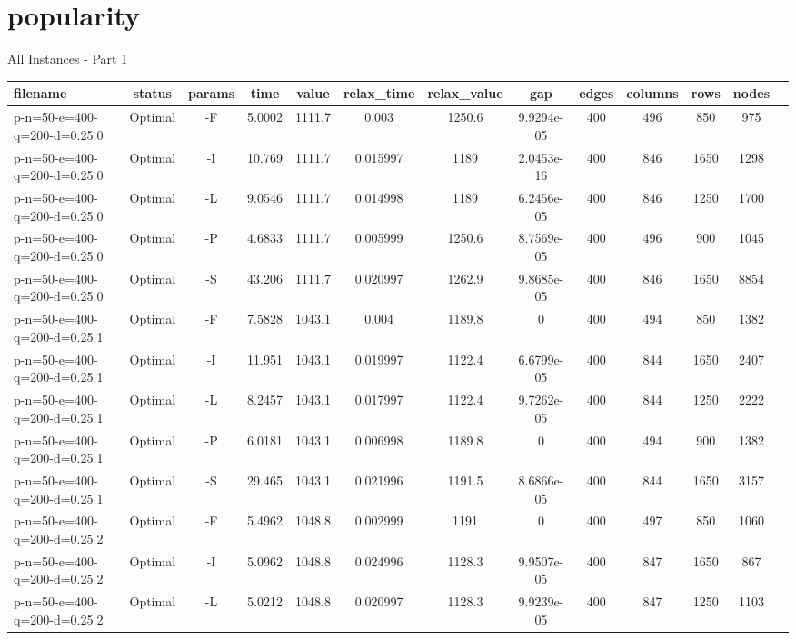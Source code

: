 \documentclass[landscape, a4paper]{article}
\begin{document}
\section{popularity}
\begin{center}
All Instances - Part 1

\begin{tabular}{lcccccccccccc}
filename & status & params & time & value & relax\_time & relax\_value & gap & edges & columns & rows & nodes & \\
\hline
p-n=50-e=400-q=200-d=0.25.0 & Optimal & -F & 5.0002 & 1111.7 & 0.003 & 1250.6 & 9.9294e-05 & 400 & 496 & 850 & 975 & \\
p-n=50-e=400-q=200-d=0.25.0 & Optimal & -I & 10.769 & 1111.7 & 0.015997 & 1189 & 2.0453e-16 & 400 & 846 & 1650 & 1298 & \\
p-n=50-e=400-q=200-d=0.25.0 & Optimal & -L & 9.0546 & 1111.7 & 0.014998 & 1189 & 6.2456e-05 & 400 & 846 & 1250 & 1700 & \\
p-n=50-e=400-q=200-d=0.25.0 & Optimal & -P & 4.6833 & 1111.7 & 0.005999 & 1250.6 & 8.7569e-05 & 400 & 496 & 900 & 1045 & \\
p-n=50-e=400-q=200-d=0.25.0 & Optimal & -S & 43.206 & 1111.7 & 0.020997 & 1262.9 & 9.8685e-05 & 400 & 846 & 1650 & 8854 & \\
p-n=50-e=400-q=200-d=0.25.1 & Optimal & -F & 7.5828 & 1043.1 & 0.004 & 1189.8 & 0 & 400 & 494 & 850 & 1382 & \\
p-n=50-e=400-q=200-d=0.25.1 & Optimal & -I & 11.951 & 1043.1 & 0.019997 & 1122.4 & 6.6799e-05 & 400 & 844 & 1650 & 2407 & \\
p-n=50-e=400-q=200-d=0.25.1 & Optimal & -L & 8.2457 & 1043.1 & 0.017997 & 1122.4 & 9.7262e-05 & 400 & 844 & 1250 & 2222 & \\
p-n=50-e=400-q=200-d=0.25.1 & Optimal & -P & 6.0181 & 1043.1 & 0.006998 & 1189.8 & 0 & 400 & 494 & 900 & 1382 & \\
p-n=50-e=400-q=200-d=0.25.1 & Optimal & -S & 29.465 & 1043.1 & 0.021996 & 1191.5 & 8.6866e-05 & 400 & 844 & 1650 & 3157 & \\
p-n=50-e=400-q=200-d=0.25.2 & Optimal & -F & 5.4962 & 1048.8 & 0.002999 & 1191 & 0 & 400 & 497 & 850 & 1060 & \\
p-n=50-e=400-q=200-d=0.25.2 & Optimal & -I & 5.0962 & 1048.8 & 0.024996 & 1128.3 & 9.9507e-05 & 400 & 847 & 1650 & 867 & \\
p-n=50-e=400-q=200-d=0.25.2 & Optimal & -L & 5.0212 & 1048.8 & 0.020997 & 1128.3 & 9.9239e-05 & 400 & 847 & 1250 & 1103 & \\

\end{tabular}
\end{center}
\end{document}
